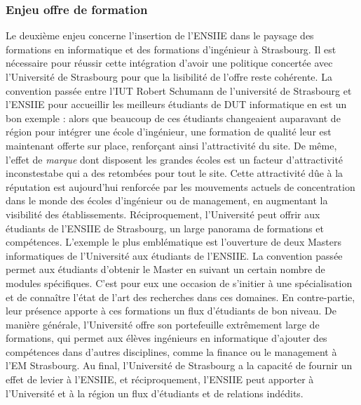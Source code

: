 \documentclass[11pt]{article}
\begin{document}
\subsubsection*{Enjeu offre de formation}
Le  deuxième  enjeu  concerne  l'insertion  de  l'ENSIIE  dans  le  paysage  des
formations en informatique  et des formations d'ingénieur à  Strasbourg.  Il est
nécessaire pour réussir  cette intégration d'avoir une  politique concertée avec
l'Université de Strasbourg pour que la lisibilité de l'offre reste cohérente. La
convention passée entre  l'IUT Robert Schumann de l'université  de Strasbourg et
l'ENSIIE pour accueillir  les meilleurs étudiants de DUT informatique  en est un
bon exemple  : alors  que beaucoup  de ces  étudiants changeaient  auparavant de
région pour  intégrer une école d'ingénieur,  une formation de qualité  leur est
maintenant offerte sur place, renforçant  ainsi l'attractivité du site. De même,
l'effet  de \emph{marque}  dont  disposent  les grandes  écoles  est un  facteur
d'attractivité  inconstestabe qui  a des  retombées  pour tout  le site.   Cette
attractivité dûe  à la réputation  est aujourd'hui renforcée par  les mouvements
actuels de concentration dans le monde  des écoles d'ingénieur ou de management,
en augmentant  la visibilité  des établissements.   Réciproquement, l'Université
peut  offrir aux  étudiants  de l'ENSIIE  de Strasbourg,  un  large panorama  de
formations et  compétences. L'exemple  le plus  emblématique est  l'ouverture de
deux  Masters  informatiques de  l'Université  aux  étudiants de  l'ENSIIE.   La
convention passée permet aux étudiants d'obtenir le Master en suivant un certain
nombre de  modules spécifiques. C'est pour  eux une occasion de  s'initier à une
spécialisation et de connaître l'état de l'art des recherches dans ces domaines.
En contre-partie, leur présence apporte à  ces formations un flux d'étudiants de
bon niveau. De manière générale, l'Université offre son portefeuille extrêmement
large de formations, qui permet  aux élèves ingénieurs en informatique d'ajouter
des compétences dans  d'autres disciplines, comme la finance ou  le management à
l'EM Strasbourg. Au  final, l'Université de Strasbourg a la  capacité de fournir
un  effet de  levier à  l'ENSIIE, et  réciproquement, l'ENSIIE  peut apporter  à
l'Université et à la région un flux d'étudiants et de relations indédits.
\end{document}
